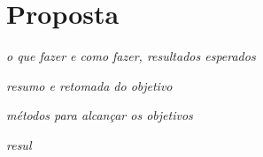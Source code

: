 \chapter{Proposta}
\label{cha:proposta}

\textit{o que fazer e como fazer, resultados esperados}

\textit{resumo e retomada do objetivo}

\textit{métodos para alcançar os objetivos}

\textit{resul}

